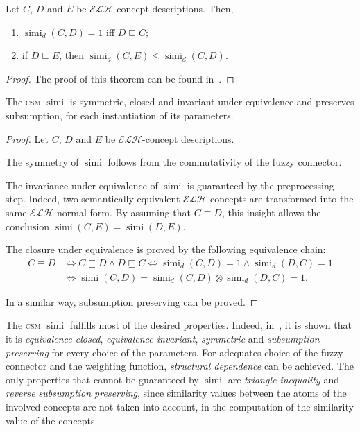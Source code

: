\documentclass[]{llncs}
\DeclareMathOperator{\simi}{simi}
\newcommand{\elh}{\(\mathcal{ELH}{}\)}
\newcommand{\csm}{\textsc{csm}}
\begin{document}
  \begin{lemma}
    Let \(C\), \(D\) and \(E\) be \elh-concept descriptions.
    Then,
    \begin{enumerate}
      \item \(\simi_d(C,D) = 1\) iff \(D \sqsubseteq C\);
      \item if \(D \sqsubseteq E\), then \(\simi_d(C,E) \le \simi_d(C,D)\).
    \end{enumerate}
  \end{lemma}
  \begin{proof}
    The proof of this theorem can be found in~\cite{LeTu12}.
  \end{proof}
  \begin{theorem}
    The \csm{} \(\simi\) is symmetric, closed and invariant under equivalence and preserves subsumption, for each instantiation of its parameters.
  \end{theorem}
  \begin{proof}
    Let \(C\), \(D\) and \(E\) be \elh-concept descriptions.

    The symmetry of \(\simi\) follows from the commutativity of the fuzzy connector.

    The invariance under equivalence of \(\simi\) is guaranteed by the preprocessing step.
    Indeed, two semantically equivalent \elh-concepts are transformed into the same \elh-normal form.
    By assuming that \(C \equiv D\), this insight allows the conclusion \(\simi(C,E) = \simi(D,E)\).

    The closure under equivalence is proved by the following equivalence chain:
    \begin{equation*}
      \begin{split}
        C \equiv D &\iff C \sqsubseteq D \land D \sqsubseteq C \iff
        \simi_d(C,D) = 1 \land \simi_d(D,C) = 1 \\ &\iff
        \simi(C,D) = \simi_d(C,D) \otimes \simi_d(D,C) = 1.
      \end{split}
    \end{equation*}

    In a similar way, subsumption preserving can be proved.
  \end{proof}
  The \csm{} \(\simi\) fulfills most of the desired properties.
  Indeed, in~\cite{LeTu12}, it is shown that it is \emph{equivalence closed}, \emph{equivalence invariant}, \emph{symmetric} and \emph{subsumption preserving} for every choice of the parameters.
  For adequates choice of the fuzzy connector and the weighting function, \emph{structural dependence} can be achieved.
  The only properties that cannot be guaranteed by \(\simi\) are \emph{triangle inequality} and \emph{reverse subsumption preserving}, since similarity values between the atoms of the involved concepts are not taken into account, in the computation of the similarity value of the concepts.
\end{document}
